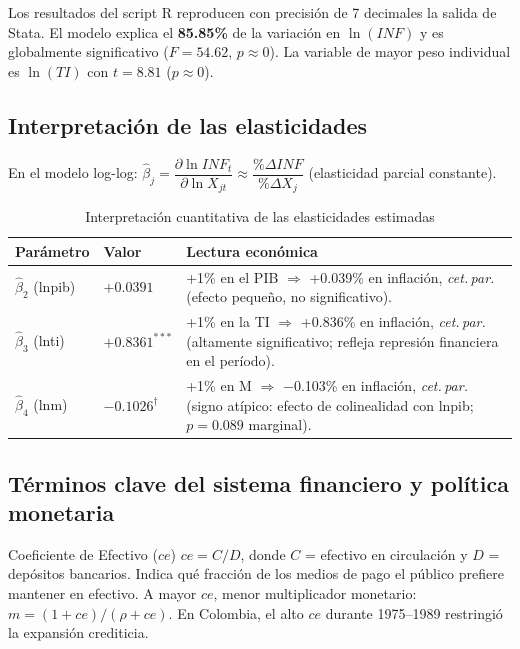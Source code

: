 \documentclass[12pt,a4paper]{article}
\begin{document}
\begin{resbox}
Los resultados del script R reproducen con precisión de 7 decimales la salida de Stata.
El modelo explica el \textbf{85.85\%} de la variación en $\ln(INF)$ y es globalmente
significativo ($F=54.62$, $p\approx0$). La variable de mayor peso individual es
$\ln(TI)$ con $t=8.81$ ($p\approx0$).
\end{resbox}

\subsection{Interpretación de las elasticidades}

En el modelo log-log: $\hat\beta_j=\dfrac{\partial\ln INF_t}{\partial\ln X_{jt}}
\approx\dfrac{\%\Delta INF}{\%\Delta X_j}$ (elasticidad parcial constante).

\begin{table}[H]\centering
\caption{Interpretación cuantitativa de las elasticidades estimadas}
\begin{tabularx}{\linewidth}{llX}
\toprule
\textbf{Parámetro} & \textbf{Valor} & \textbf{Lectura económica}\\
\midrule
$\hat\beta_2$ (lnpib) & $+0.0391$ &
  +1\% en el PIB $\Rightarrow$ +0.039\% en inflación, \textit{cet.\,par.}
  (efecto pequeño, no significativo). \\[4pt]
$\hat\beta_3$ (lnti) & $+0.8361^{***}$ &
  +1\% en la TI $\Rightarrow$ +0.836\% en inflación, \textit{cet.\,par.}
  (altamente significativo; refleja represión financiera en el período). \\[4pt]
$\hat\beta_4$ (lnm) & $-0.1026^{\dag}$ &
  +1\% en M $\Rightarrow$ $-$0.103\% en inflación, \textit{cet.\,par.}
  (signo atípico: efecto de colinealidad con lnpib; $p=0.089$ marginal). \\
\bottomrule
\end{tabularx}
\end{table}

\subsection{Términos clave del sistema financiero y política monetaria}

\begin{defbox}{Coeficiente de Efectivo ($ce$)}
$ce = C/D$, donde $C$ = efectivo en circulación y $D$ = depósitos bancarios.
Indica qué fracción de los medios de pago el público prefiere mantener en
efectivo. A mayor $ce$, menor multiplicador monetario:
$m = (1+ce)/(\rho+ce)$.
En Colombia, el alto $ce$ durante 1975--1989 restringió la expansión crediticia.
\end{defbox}
\end{document}
